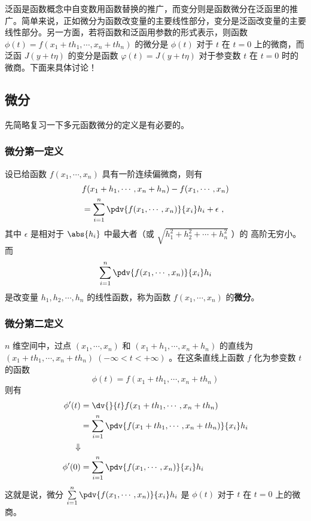 
泛函是函数概念中自变数用函数替换的推广，而变分则是函数微分在泛函里的推广。简单来说，正如微分为函数改变量的主要线性部分，变分是泛函改变量的主要线性部分。另一方面，若将函数和泛函用参数的形式表示，则函数$\phi(t)=f(x_1+th_1,\cdots,x_n+th_n) $ 的微分是 $\phi(t)$ 对于 $t$ 在 $t=0$ 上的微商，而泛函 $J(y+t\eta)$ 的变分是函数 $\varphi(t)=J(y+t\eta)$ 对于参变数 $t$ 在 $t=0$ 时的微商。下面来具体讨论！
\subsection{微分}
先简略复习一下多元函数微分的定义是有必要的。
\subsubsection{微分第一定义}
设已给函数 $f(x_1,\cdots,x_n)$ 具有一阶连续偏微商，则有
\begin{equation}
\begin{aligned}
&f(x_1+h_1,\cdots,x_n+h_n)-f(x_1,\cdots,x_n)\\
&=\sum_{i=1}^{n} \pdv{f(x_1,\cdots,x_n)}{x_i}h_i+\epsilon~,
\end{aligned}
\end{equation}
其中 $\epsilon$ 是相对于 $\abs{h_i}$ 中最大者（或 $\sqrt{h_1^2+h_2^2+\cdots+h_n^2}$ ）的 高阶无穷小。而 
\begin{equation}
\sum_{i=1}^{n} \pdv{f(x_1,\cdots,x_n)}{x_i}h_i
\end{equation}
是改变量 $h_1,h_2,\cdots,h_n$ 的线性函数，称为函数 $f(x_1,\cdots,x_n)$ 的\textbf{微分}。
\subsubsection{微分第二定义}
$n$ 维空间中，过点 $(x_1,\cdots,x_n)$ 和 $(x_1+h_1,\cdots,x_n+h_n)$ 的直线为 $(x_1+th_1,\cdots,x_n+th_n)\;(-\infty<t<+\infty)$ 。在这条直线上函数 $f$ 化为参变数 $t$ 的函数
\begin{equation}
\phi(t)=f(x_1+th_1,\cdots,x_n+th_n) 
\end{equation}
则有
\begin{equation}
\begin{aligned}
\phi'(t)&=\dv{}{t}f(x_1+th_1,\cdots,x_n+th_n) \\
&=\sum_{i=1}^n\pdv{f(x_1+th_1,\cdots,x_n+th_n)}{x_i}h_i
\\
\Downarrow
\\
\phi'(0)&=\sum_{i=1}^n\pdv{f(x_1,\cdots,x_n)}{x_i}h_i
\end{aligned}
\end{equation}
这就是说，微分 $\sum\limits_{i=1}^n\pdv{f(x_1,\cdots,x_n)}{x_i}h_i$ 是 $\phi(t)$ 对于 $t$ 在 $t=0$ 上的微商。
